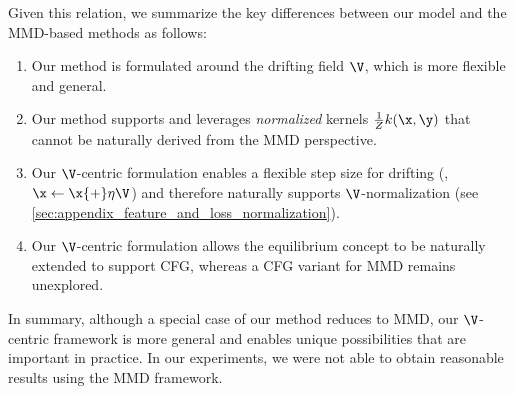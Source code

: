 Given this relation, we summarize the key differences between our model and the MMD-based methods as follows:
\begin{enumerate}
[itemsep=1pt, topsep=1pt, parsep=1pt, partopsep=1pt, label=(\roman*)]
    \item Our method is formulated around the drifting field $\V$, which is more flexible and general.
    \item Our method supports and leverages \textit{normalized} kernels $\frac{1}{Z}k(\x, \y)$ that cannot be naturally derived from the MMD perspective.
    \item Our $\V$-centric formulation enables a flexible step size for drifting (\ie, $\x \leftarrow \x{+}\eta\V$) and therefore naturally supports $\V$-normalization (see \ref{sec:appendix_feature_and_loss_normalization}).
    \item Our $\V$-centric formulation allows the equilibrium concept to be naturally extended to support CFG, whereas a CFG variant for MMD remains unexplored.
\end{enumerate}
In summary, although a special case of our method reduces to MMD, our $\V$-centric framework is more general and enables unique possibilities that are important in practice.
In our experiments, we were not able to obtain reasonable results using the MMD framework.

